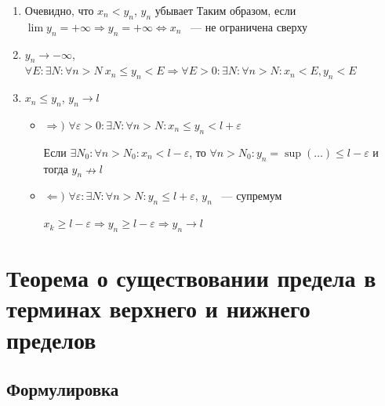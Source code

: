 \documentclass{article}
\begin{document}
            \begin{enumerate}
            
                \item Очевидно, что $x_n < y_n$, $y_n$ убывает Таким образом, если $\lim y_n = +\infty \Longrightarrow y_n = +\infty \Longleftrightarrow x_n$ ~--- не ограничена сверху
                
                \item $y_n \rightarrow -\infty$, $\forall E : \exists N : \forall n > N \ x_n \leq y_n < E \Rightarrow \forall E > 0 : \exists N : \forall n > N : x_n < E, y_n < E$
                
                \item $x_n \leq y_n$, $y_n \rightarrow l$
                
                \begin{itemize}
                
                    \item $\Rightarrow)$ $\forall \varepsilon > 0 : \exists N : \forall n > N : x_n \leq y_n < l + \varepsilon$
                    
                        Если $\exists N_0 : \forall n > N_0 : x_n < l - \varepsilon$, то $\forall n > N_0 : y_n = \sup(\ldots) \leq l - \varepsilon$ и тогда $y_n \nrightarrow l$
                        
                    \item $\Leftarrow)$ $\forall \varepsilon : \exists N : \forall n > N : y_n \leq l + \varepsilon$, $y_n$ ~--- супремум
                    
                        $x_k \geq l - \varepsilon \Rightarrow y_n \geq l - \varepsilon \Rightarrow y_n \rightarrow l$
                        
                \end{itemize}
                
            \end{enumerate}
            
    \newpage
    
    \section{Теорема о существовании предела в терминах верхнего и нижнего пределов}
    
        \subsection{Формулировка}
        
\end{document}
